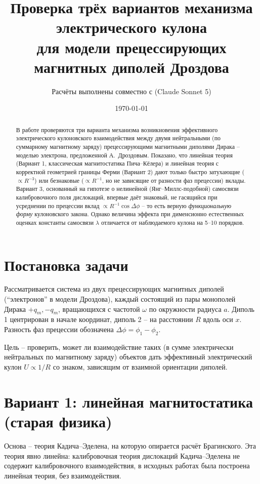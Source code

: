 \documentclass[12pt,a4paper]{article}
\title{Проверка трёх вариантов механизма электрического кулона \\
для модели прецессирующих магнитных диполей Дроздова}
\author{Расчёты выполнены совместно с (Claude Sonnet 5)}
\date{\today}
\begin{document}
\maketitle

\begin{abstract}
В работе проверяются три варианта механизма возникновения эффективного
электрического кулоновского взаимодействия между двумя нейтральными
(по суммарному магнитному заряду) прецессирующими магнитными диполями
Дирака -- моделью электрона, предложенной А.~Дроздовым. Показано, что
линейная теория (Вариант 1, классическая магнитостатика Пича--Кёлера) и
линейная теория с корректной геометрией границы Ферми (Вариант 2) дают
только быстро затухающие ($\propto R^{-3}$) или безнаковые ($\propto R^{-1}$,
но не зависящие от разности фаз прецессии) вклады. Вариант 3, основанный
на гипотезе о нелинейной (Янг--Миллс-подобной) самосвязи калибровочного
поля дислокаций, впервые даёт знаковый, не гасящийся при усреднении по
прецессии вклад $\propto R^{-1}\cos\Delta\phi$ -- то есть верную
\emph{функциональную форму} кулоновского закона. Однако величина эффекта
при дименсионно естественных оценках константы самосвязи $\lambda$
отличается от наблюдаемого кулона на 5--10 порядков.
\end{abstract}

\tableofcontents

\section{Постановка задачи}

Рассматривается система из двух прецессирующих магнитных диполей
(``электронов'' в модели Дроздова), каждый состоящий из пары монополей
Дирака $+q_m,-q_m$, вращающихся с частотой $\omega$ по окружности радиуса
$a$. Диполь 1 центрирован в начале координат, диполь 2 -- на расстоянии
$R$ вдоль оси $x$. Разность фаз прецессии обозначена $\Delta\phi=\phi_1-\phi_2$.

Цель -- проверить, может ли взаимодействие таких (в сумме электрически
нейтральных по магнитному заряду) объектов дать эффективный электрический
кулон $U\propto 1/R$ со знаком, зависящим от взаимной ориентации диполей.

\section{Вариант 1: линейная магнитостатика (старая физика)}

Основа -- теория Кадича--Эделена, на которую опирается расчёт
Брагинского. Эта теория явно линейна: калибровочная теория
дислокаций Кадича--Эделена не содержит калибровочного взаимодействия,
в исходных работах была построена линейная теория, без взаимодействия.
\end{document}
